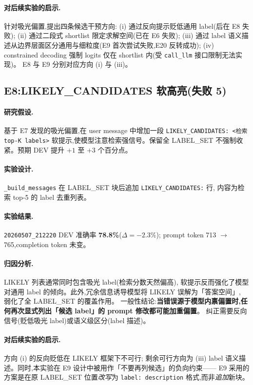 \documentclass[11pt,a4paper]{ctexart}
\begin{document}
\paragraph{对后续实验的启示.}针对吸光偏置,提出四条候选干预方向:
(i) 通过反向提示贬低通用 label(后在 E8 失败);
(ii) 通过二段式 shortlist 限定求解空间(已在 E6 失败);
(iii) 通过 label 语义描述从边界层面区分通用与细粒度(E9 首次尝试失败,E20 反转成功);
(iv) constrained decoding 强制 logits 仅在 shortlist 内(受 \texttt{call\_llm} 接口限制无法实现)。
E8 与 E9 分别对应方向 (i) 与 (iii)。

\subsection{E8:LIKELY\_CANDIDATES 软高亮(失败 5)}

\paragraph{研究假设.}基于 E7 发现的吸光偏置,在 user message 中增加一段 \texttt{LIKELY\_CANDIDATES: <检索 top-K labels>}
软提示,使模型注意检索强信号。保留全 LABEL\_SET 不强制收紧。预期 DEV 提升 $+1$ 至 $+3$ 个百分点。

\paragraph{实验设计.}\texttt{\_build\_messages} 在 LABEL\_SET 块后追加 \texttt{LIKELY\_CANDIDATES:} 行,
内容为检索 top-5 的 label 去重列表。

\paragraph{实验结果.}\texttt{20260507\_212220} DEV 准确率 \textbf{78.8\%}($\Delta = -2.3\%$);
prompt token 713 $\to$ 765,completion token 未变。

\paragraph{归因分析.}LIKELY 列表通常同时包含吸光 label(检索分数天然偏高),
软提示反而强化了模型对通用 label 的倾向。此外,冗余信息诱导模型将 LIKELY 误解为「答案空间」,
弱化了全 LABEL\_SET 的覆盖作用。
一般性结论:\textbf{当错误源于模型内禀偏置时,任何再次显式列出「候选 label」的 prompt 修改都可能加重偏置}。
纠正需要反向信号(贬低吸光 label)或语义级区分(label 描述)。

\paragraph{对后续实验的启示.}方向 (i) 的反向贬低在 LIKELY 框架下不可行;
剩余可行方向为 (iii) label 语义描述。同时,本实验在 E9 设计中被用作「不要再列候选」的负向约束——
E9 采用的方案是在原 LABEL\_SET 位置\textit{改写}为 \verb|label: description| 格式,而非\textit{追加}新块。
\end{document}
